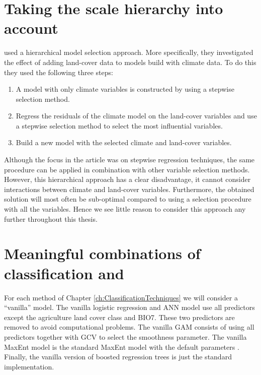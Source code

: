 \section{Taking the scale hierarchy into account}
\label{sec:TakingTheScaleHierarchyIntoAccount}
\cite{thuiller_we_2004} used a hierarchical model selection approach. More specifically, they investigated the effect of adding land-cover data to models build with climate data. To do this they used the following three steps:
\begin{enumerate}
\item A model with only climate variables is constructed by using a stepwise selection method.
\item Regress the residuals of the climate model on the land-cover variables and use a stepwise selection method to select the most influential variables.
\item Build a new model with the selected climate and land-cover variables.
\end{enumerate}
Although the focus in the article was on stepwise regression techniques, the same procedure can be applied in combination with other variable selection methods. However, this hierarchical approach has a clear disadvantage, it cannot consider interactions between climate and land-cover variables. Furthermore, the obtained solution will most often be sub-optimal compared to using a selection procedure with all the variables. Hence we see little reason to consider this approach any further throughout this thesis.


\section{Meaningful combinations of classification and }
\label{sec:combinations}
 

For each method of Chapter \ref{ch:ClassificationTechniques} we will consider a ``vanilla'' model. The vanilla logistic regression and ANN model use all predictors except the agriculture land cover class and BIO7. These two predictors are removed to avoid computational problems. The vanilla GAM consists of using all predictors together with GCV to select the smoothness parameter. The vanilla MaxEnt model is the standard MaxEnt model with the default parameters \parencite{phillips_modeling_2008}. Finally, the vanilla version of boosted regression trees is just the standard implementation. \\

